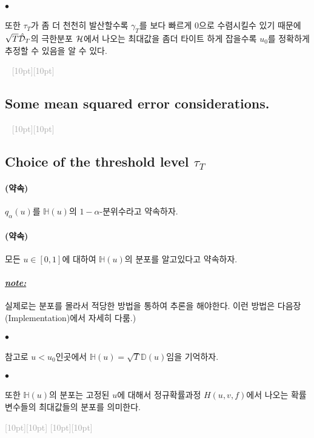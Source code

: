 \documentclass[12pt,oneside,english]{book}
\newcommand{\dash}{\vspace{2em}\noindent \textcolor{darkgray}{\hrulefill~ \raisebox{-2.5pt}[10pt][10pt]{\leafright \decofourleft \decothreeleft  \aldineright \decotwo \floweroneleft \decoone   \floweroneright \decotwo \aldineleft\decothreeright \decofourright \leafleft} ~  \hrulefill \\ \vspace{2em}}}
\newcommand{\rdash}{\noindent \textcolor{darkgray}{ \raisebox{-1.9pt}[10pt][10pt]{\leafright} \hrulefill \raisebox{-1.9pt}[10pt][10pt]{\leafright \decofourleft \decothreeleft  \aldineright \decotwo \floweroneleft \decoone}}}
\def\ck{\paragraph{\LARGE$\bullet$}\LARGE}
\def\promise{\paragraph{\LARGE(약속)}\LARGE}
\def\note{\paragraph{\LARGE\textit{\underline{note:}}}\LARGE}
\begin{document}
\ck 또한 $\tau_T$가 좀 더 천천히 발산할수록 $\gamma_T$를 보다 빠르게 0으로 수렴시킬수 있기 때문에 $\sqrt{T}\hat{\cal D}_T$의 극한분포 $\cal H$에서 나오는 최대값을 좀더 타이트 하게 잡을수록 $u_0$를 정확하게 추정할 수 있음을 알 수 있다. 

\dash 
\subsection{Some mean squared error considerations.}


\dash 

\subsection{Choice of the threshold level $\tau_T$}


\promise $q_{\alpha}(u)$를 $\mathbb{H}(u)$의 $1-\alpha$-분위수라고 약속하자. 

\promise 모든 $u\in [0,1]$에 대하여 $\mathbb{H}(u)$의 분포를 알고있다고 약속하자. 

\note 실제로는 분포를 몰라서 적당한 방법을 통하여 추론을 해야한다. 이런 방법은 다음장(Implementation)에서 자세히 다룸.)

\ck 참고로 $u<u_0$인곳에서 $\mathbb{H}(u)=\sqrt{T}\mathbb{D}(u)$임을 기억하자. 
\ck 또한 $\mathbb{H}(u)$의 분포는 고정된 $u$에 대해서 정규확률과정 $H(u,v,f)$에서 나오는 확률변수들의 최대값들의 분포를 의미한다. 

\rdash 
\end{document}
